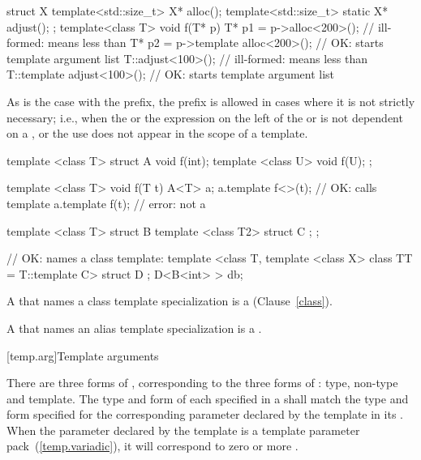 \enterexample

\begin{codeblock}
struct X {
  template<std::size_t> X* alloc();
  template<std::size_t> static X* adjust();
};
template<class T> void f(T* p) {
  T* p1 = p->alloc<200>();          // ill-formed: \tcode{<} means less than
  T* p2 = p->template alloc<200>(); // OK: \tcode{<} starts template argument list
  T::adjust<100>();                 // ill-formed: \tcode{<} means less than
  T::template adjust<100>();        // OK: \tcode{<} starts template argument list
}
\end{codeblock}
\exitexample

\enternote
As is the case with the
prefix, the
prefix is allowed in cases where it is not strictly
necessary; i.e., when the  or
the expression on the left of
the
\tcode{->}
or
is not dependent on a
, or the use does not appear in the
scope of a template.
\exitnote
\enterexample
\begin{codeblock}
template <class T> struct A {
  void f(int);
  template <class U> void f(U);
};

template <class T> void f(T t) {
  A<T> a;
  a.template f<>(t);                // OK: calls template
  a.template f(t);                  // error: not a 
}

template <class T> struct B {
  template <class T2> struct C { };
};

// OK:  names a class template:
template <class T, template <class X> class TT = T::template C> struct D { };
D<B<int> > db;
\end{codeblock}
\exitexample

\pnum
{}%
A
that names a class template specialization is a
(Clause~\ref{class}).

\pnum
A  that names an alias template
specialization is a .

[temp.arg]{Template arguments}

\pnum
{}%
There are three forms of
,
corresponding to the three forms of
:
type, non-type and template.
The type and form of each
specified in a
shall match the type and form specified for the corresponding
parameter declared by the template in its
.
When the parameter declared by the template is a template
parameter pack~(\ref{temp.variadic}), it will correspond to zero or more
.
\enterexample

